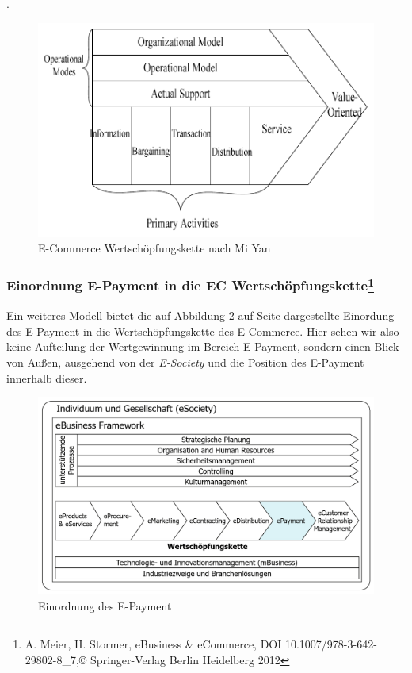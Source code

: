 .
\begin{figure}[htb]
\centering
\includegraphics[width=\textwidth]{img/value_chain_ec1.png}
\caption{E-Commerce Wertschöpfungskette nach Mi Yan}
\label{fig:ecvc_00}
\end{figure}

\subsubsection[Einordnung E-Payment in die EC Wertschöpfungskette]{Einordnung E-Payment in die EC Wertschöpfungskette\footnote{A. Meier, H. Stormer, eBusiness \& eCommerce, DOI 10.1007/978-3-642-29802-8\_7,© Springer-Verlag Berlin Heidelberg 2012}}
Ein weiteres Modell bietet die auf Abbildung \ref{fig:ecvc_01} auf Seite \pageref{fig:ecvc_01} dargestellte Einordung des E-Payment in die Wertschöpfungskette des E-Commerce. Hier sehen wir also keine Aufteilung der Wertgewinnung im Bereich E-Payment, sondern einen Blick von Außen, ausgehend von der \emph{E-Society} und die Position des E-Payment innerhalb dieser.
\begin{figure}[htb]
\centering
\includegraphics[width=\textwidth]{img/value_chain_ec2.png}
\caption{Einordnung des E-Payment}
\label{fig:ecvc_01}
\end{figure}
